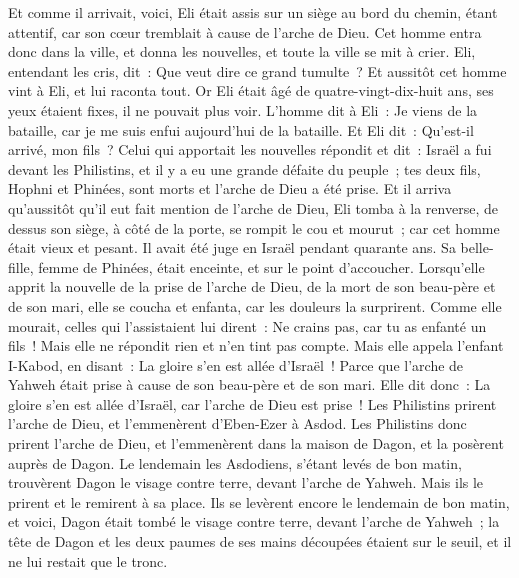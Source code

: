 \begin{multicols}{2}
Et comme il arrivait, voici, Eli était assis sur un siège au bord du chemin, étant attentif, car son cœur tremblait à cause de l'arche de Dieu. Cet homme entra donc dans la ville, et donna les nouvelles, et toute la ville se mit à crier.
Eli, entendant les cris, dit~: Que veut dire ce grand tumulte~? Et aussitôt cet homme vint à Eli, et lui raconta tout.
Or Eli était âgé de quatre-vingt-dix-huit ans, ses yeux étaient fixes, il ne pouvait plus voir.
L'homme dit à Eli~: Je viens de la bataille, car je me suis enfui aujourd'hui de la bataille. Et Eli dit~: Qu'est-il arrivé, mon fils~?
Celui qui apportait les nouvelles répondit et dit~: Israël a fui devant les Philistins, et il y a eu une grande défaite du peuple~; tes deux fils, Hophni et Phinées, sont morts et l'arche de Dieu a été prise.
Et il arriva qu'aussitôt qu'il eut fait mention de l'arche de Dieu, Eli tomba à la renverse, de dessus son siège, à côté de la porte, se rompit le cou et mourut~; car cet homme était vieux et pesant. Il avait été juge en Israël pendant quarante ans.
Sa belle-fille, femme de Phinées, était enceinte, et sur le point d'accoucher. Lorsqu'elle apprit la nouvelle de la prise de l'arche de Dieu, de la mort de son beau-père et de son mari, elle se coucha et enfanta, car les douleurs la surprirent.
Comme elle mourait, celles qui l'assistaient lui dirent~: Ne crains pas, car tu as enfanté un fils~! Mais elle ne répondit rien et n'en tint pas compte.
Mais elle appela l'enfant I-Kabod, en disant~: La gloire s'en est allée d'Israël~! Parce que l'arche de Yahweh était prise à cause de son beau-père et de son mari.
Elle dit donc~: La gloire s'en est allée d'Israël, car l'arche de Dieu est prise~!
\VerseOne{}Les Philistins prirent l'arche de Dieu, et l'emmenèrent d'Eben-Ezer à Asdod.
Les Philistins donc prirent l'arche de Dieu, et l'emmenèrent dans la maison de Dagon, et la posèrent auprès de Dagon.
Le lendemain les Asdodiens, s'étant levés de bon matin, trouvèrent Dagon le visage contre terre, devant l'arche de Yahweh. Mais ils le prirent et le remirent à sa place.
Ils se levèrent encore le lendemain de bon matin, et voici, Dagon était tombé le visage contre terre, devant l'arche de Yahweh~; la tête de Dagon et les deux paumes de ses mains découpées étaient sur le seuil, et il ne lui restait que le tronc.

\end{multicols}
